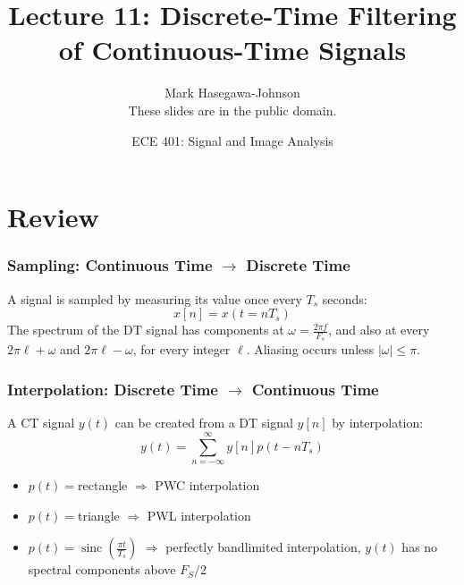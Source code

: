 \documentclass{beamer}
\title{Lecture 11: Discrete-Time Filtering of Continuous-Time Signals}
\author{Mark Hasegawa-Johnson\\These slides are in the public domain.}
\date{ECE 401: Signal and Image Analysis}
\DeclareMathOperator{\sinc}{sinc}
\begin{document}
\begin{frame}
  \maketitle
\end{frame}

\begin{frame}
  \tableofcontents
\end{frame}

\section{Review}
\setcounter{subsection}{1}

\begin{frame}
  \frametitle{Sampling: Continuous Time $\rightarrow$ Discrete Time}

  A signal is sampled by measuring its value once every $T_s$ seconds:
  \begin{displaymath}
    x[n] = x(t=nT_s)
  \end{displaymath}
  The spectrum of the DT signal has components at $\omega=\frac{2\pi
    f}{F_s}$, and also at every $2\pi\ell+\omega$ and $2\pi\ell-\omega$, for
  every integer $\ell$.  Aliasing occurs unless $|\omega|\le\pi$.
\end{frame}


\begin{frame}
  \frametitle{Interpolation: Discrete Time $\rightarrow$ Continuous Time}

  A CT signal $y(t)$ can be created from a DT signal $y[n]$ by interpolation:
  \begin{displaymath}
    y(t) = \sum_{n=-\infty}^\infty y[n]p(t-nT_s)
  \end{displaymath}
  \begin{itemize}
  \item $p(t)=$rectangle $\Rightarrow$ PWC interpolation
  \item $p(t)=$triangle $\Rightarrow$ PWL interpolation
  \item $p(t)=\sinc\left(\frac{\pi t}{T_s}\right)$ $\Rightarrow$ perfectly bandlimited interpolation,
    $y(t)$ has no spectral components above $F_S/2$
  \end{itemize}
\end{frame}
\end{document}
